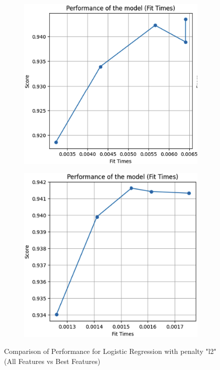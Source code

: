 \documentclass[conference]{IEEEtran}
\begin{document}
\begin{figure}[htbp]
    \centering
    \begin{subfigure}[b]{0.45\linewidth}
        \centering
        \includegraphics[width=\linewidth]{images/PerformancePenaltyAllFeatures.png}
        \label{fig:performance-all}
    \end{subfigure}
    \hfill
    \begin{subfigure}[b]{0.45\linewidth}
        \centering
        \includegraphics[width=\linewidth]{images/PerformancePenaltyBestFeatures.png}
        \label{fig:performance-best}
    \end{subfigure}
    \caption{Comparison of Performance for Logistic Regression with penalty "l2" (All Features vs Best Features)}
    \label{fig:performance-comparison}
\end{figure}
\end{document}
